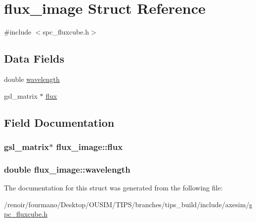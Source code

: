\hypertarget{structflux__image}{
\section{flux\_\-image Struct Reference}
\label{structflux__image}
}


{\ttfamily \#include $<$spc\_\-fluxcube.h$>$}\subsection*{Data Fields}
\begin{DoxyCompactItemize}
\item 
double \hyperlink{structflux__image_a5f1c5f618a37935d59c16a56afd5eba2}{wavelength}
\item 
gsl\_\-matrix $\ast$ \hyperlink{structflux__image_a1913e83222367e56da001f9e27e1702b}{flux}
\end{DoxyCompactItemize}


\subsection{Field Documentation}
\hypertarget{structflux__image_a1913e83222367e56da001f9e27e1702b}{
\subsubsection[{flux}]{\setlength{\rightskip}{0pt plus 5cm}gsl\_\-matrix$\ast$ {\bf flux\_\-image::flux}}}
\label{structflux__image_a1913e83222367e56da001f9e27e1702b}
\hypertarget{structflux__image_a5f1c5f618a37935d59c16a56afd5eba2}{
\subsubsection[{wavelength}]{\setlength{\rightskip}{0pt plus 5cm}double {\bf flux\_\-image::wavelength}}}
\label{structflux__image_a5f1c5f618a37935d59c16a56afd5eba2}


The documentation for this struct was generated from the following file:\begin{DoxyCompactItemize}
\item 
/renoir/fourmano/Desktop/OUSIM/TIPS/branches/tips\_\-build/include/axesim/\hyperlink{spc__fluxcube_8h}{spc\_\-fluxcube.h}\end{DoxyCompactItemize}
